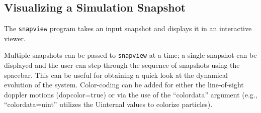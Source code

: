 \documentclass[11pt,letterpaper]{article}
\begin{document}
\subsection{Visualizing a Simulation Snapshot}

The \texttt{snapview} program takes an input snapshot and displays it in an interactive viewer. 

Multiple snapshots can be passed to \texttt{snapview} at a time; a single snapshot can be displayed and the user can step through the sequence of snapshots using the spacebar. This can be useful for obtaining a quick look at the dynamical evolution of the system. Color-coding can be added for either the line-of-sight doppler motions (dopcolor=true) or via the use of the ``colordata'' argument (e.g., ``colordata=uint'' utilizes the Uinternal values to colorize particles).
\end{document}
